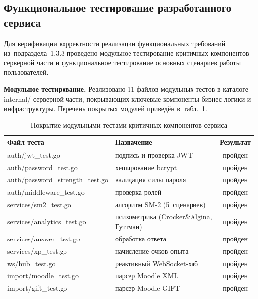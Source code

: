 \subsection{Функциональное тестирование разработанного сервиса}

Для верификации корректности реализации функциональных требований
из~подраздела~1.3.3 проведено модульное тестирование критичных
компонентов серверной части и функциональное тестирование
основных сценариев работы пользователей.

\textbf{Модульное тестирование.} Реализовано 11 файлов модульных
тестов в каталоге internal/ серверной части, покрывающих
ключевые компоненты бизнес-логики и инфраструктуры. Перечень
покрытых модулей приведён в~табл.~\ref{tab:unit-tests}.

\begin{table}[!htb]
\fontsize{11pt}{13pt}\selectfont
\centering
\caption{Покрытие модульными тестами критичных компонентов сервиса}
\label{tab:unit-tests}
\smallskip
\begin{tabular}{|l|p{8.0cm}|c|}
    \hline
    \textbf{Файл теста} & \textbf{Назначение} & \textbf{Результат} \\
    \hline
        auth/jwt\_test.go             & подпись и проверка JWT  & пройден \\
    \hline
        auth/password\_test.go        & хеширование bcrypt      & пройден \\
    \hline
        auth/password\_strength\_test.go & валидация силы пароля & пройден \\
    \hline
        auth/middleware\_test.go      & проверка ролей          & пройден \\
    \hline
        services/sm2\_test.go         & алгоритм SM-2 (5~сценариев) & пройден \\
    \hline
        services/analytics\_test.go   & психометрика (Crocker\&Algina, Гуттман) & пройден \\
    \hline
        services/answer\_test.go      & обработка ответа        & пройден \\
    \hline
        services/xp\_test.go          & начисление очков опыта  & пройден \\
    \hline
        ws/hub\_test.go               & реактивный WebSocket-хаб & пройден \\
    \hline
        import/moodle\_test.go        & парсер Moodle XML       & пройден \\
    \hline
        import/gift\_test.go          & парсер Moodle GIFT      & пройден \\
    \hline
\end{tabular}
\end{table}
\FloatBarrier

